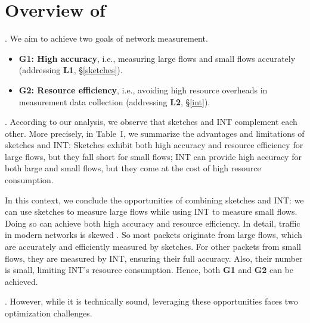\section{Overview of \sysname}\label{overview}

. We aim to achieve two goals of network measurement.

\begin{itemize}[leftmargin=*]
%
    \item \textbf{G1: High accuracy}, i.e., measuring large flows and small flows accurately (addressing \textbf{L1}, \S\ref{sketches}). 
%
    \item \textbf{G2: Resource efficiency}, i.e., avoiding high resource overheads in measurement data collection (addressing \textbf{L2}, \S\ref{int}). 
%
\end{itemize}

. According to our analysis, we observe that sketches and INT complement each other. More precisely, in Table~I, we summarize the advantages and limitations of sketches and INT: Sketches exhibit both high accuracy and resource efficiency for large flows, but they fall short for small flows; INT can provide high accuracy for both large and small flows, but they come at the cost of high resource consumption. 

In this context, we conclude the opportunities of combining sketches and INT: we can use sketches to measure large flows while using INT to measure small flows. Doing so can achieve both high accuracy and resource efficiency. In detail, traffic in modern networks is skewed \cite{roy2015inside,huang2021toward,caida,benson2010network,yang2018elastic}. So most packets originate from large flows, which are accurately and efficiently measured by sketches. For other packets from small flows, they are measured by INT, ensuring their full accuracy. Also, their number is small, limiting INT's resource consumption. Hence, both \textbf{G1} and \textbf{G2} can be achieved. 

.
However, while it is technically sound, leveraging these opportunities faces two optimization challenges.

